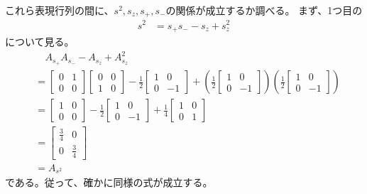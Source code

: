 これら表現行列の間に、$s^2,s_z,s_+,s_-$の関係が成立するか調べる。
まず、1つ目の
\begin{align}
	s^2
&=
	s_+ s_-
	-
	s_z
	+
	s_z^2
\end{align}
について見る。
\begin{align}
&\quad
	A_{s_+} A_{s_-}
	-
	A_{s_z}
	+
	A_{s_z}^2 \\
&=
	\left[
	\begin{array}{cc}
		0 & 1 \\
		0 & 0
	\end{array}
	\right]
	\left[
	\begin{array}{cc}
		0 & 0 \\
		1 & 0
	\end{array}
	\right]
	-
	\frac{1}{2}
	\left[
	\begin{array}{cc}
		1 & 0 \\
		0 & -1
	\end{array}
	\right]
	+
	\left(
		\frac{1}{2}
		\left[
		\begin{array}{cc}
			1 & 0 \\
			0 & -1
		\end{array}
		\right]
	\right)
	\left(
		\frac{1}{2}
		\left[
		\begin{array}{cc}
			1 & 0 \\
			0 & -1
		\end{array}
		\right]
	\right) \\
%
%
&=
	\left[
	\begin{array}{cc}
		1 & 0 \\
		0 & 0
	\end{array}
	\right]
	-
	\frac{1}{2}
	\left[
	\begin{array}{cc}
		1 & 0 \\
		0 & -1
	\end{array}
	\right]
	+
	\frac{1}{4}
	\left[
	\begin{array}{cc}
		1 & 0 \\
		0 & 1
	\end{array}
	\right] \\
%
%
&=
	\left[
	\begin{array}{cc}
		\frac{3}{4} & 0 \\[2mm]
		0 & \frac{3}{4}
	\end{array}
	\right] \\
%
%
&=
	A_{s^2}
\end{align}
である。従って、確かに同様の式が成立する。


